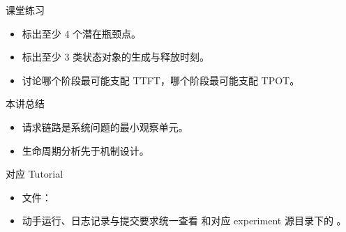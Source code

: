 \begin{frame}{课堂练习}
  \begin{itemize}
    \item 标出至少 4 个潜在瓶颈点。
    \item 标出至少 3 类状态对象的生成与释放时刻。
    \item 讨论哪个阶段最可能支配 TTFT，哪个阶段最可能支配 TPOT。
  \end{itemize}
\end{frame}



\begin{frame}{本讲总结}
  \begin{itemize}
    \item 请求链路是系统问题的最小观察单元。
    \item 生命周期分析先于机制设计。
  \end{itemize}
\end{frame}

\begin{frame}{对应 Tutorial}
  \begin{itemize}
    \item 文件：\texttt{}
    \item 动手运行、日志记录与提交要求统一查看 \texttt{} 和对应 experiment 源目录下的 \texttt{}。
  \end{itemize}
\end{frame}


